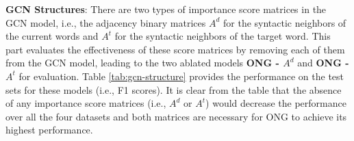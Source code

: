 \documentclass[11pt,a4paper]{article}
\begin{document}
{\bf GCN Structures}: There are two types of importance score matrices in the GCN model, i.e., the adjacency binary matrices $A^d$ for the syntactic neighbors of the current words and $A^t$ for the syntactic neighbors of the target word. This part evaluates the effectiveness of these score matrices by removing each of them from the GCN model, leading to the two ablated models {\bf ONG - $A^d$} and {\bf ONG - $A^t$} for evaluation. Table \ref{tab:gcn-structure} provides the performance on the test sets for these models (i.e., F1 scores). It is clear from the table that the absence of any importance score matrices (i.e., $A^d$ or $A^t$) would decrease the performance over all the four datasets and both matrices are necessary for ONG to achieve its highest performance.
\begin{table}[ht]
\centering
    \caption{Ablation study on the GCN structures.}
    \label{tab:gcn-structure}
\end{table}
\end{document}
